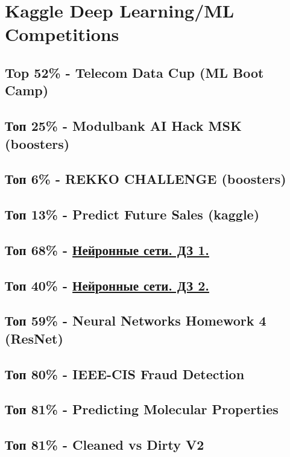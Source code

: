 \documentclass[11pt]{article}
\begin{document}
\section{Kaggle Deep Learning/ML Competitions}
\label{sec:org9904665}
\subsection{Top 52\% - Telecom Data Cup (ML Boot Camp)}
\label{sec:org5b40169}
\subsection{Топ 25\% - Modulbank AI Hack MSK (boosters)}
\label{sec:orgfa65d62}
\subsection{Топ 6\% - REKKO CHALLENGE (boosters)}
\label{sec:org60fcfc8}
\subsection{Топ 13\% - Predict Future Sales (kaggle)}
\label{sec:orgabe6e50}
\subsection{Топ 68\% - \href{https://www.kaggle.com/c/2019s-neuralnet-track}{Нейронные сети. ДЗ 1.}}
\label{sec:org865bef2}
\subsection{Топ 40\% - \href{https://www.kaggle.com/c/nn-track-2019-spring-hw2}{Нейронные сети. ДЗ 2.}}
\label{sec:orgcc348f1}
\subsection{Топ 59\% - Neural Networks Homework 4 (ResNet)}
\label{sec:org56b09d4}
\subsection{Топ 80\% - IEEE-CIS Fraud Detection}
\label{sec:org44757a0}
\subsection{Топ 81\% - Predicting Molecular Properties}
\label{sec:orgf436498}
\subsection{Топ 81\% - Cleaned vs Dirty V2}
\label{sec:org4e9294e}
\end{document}
